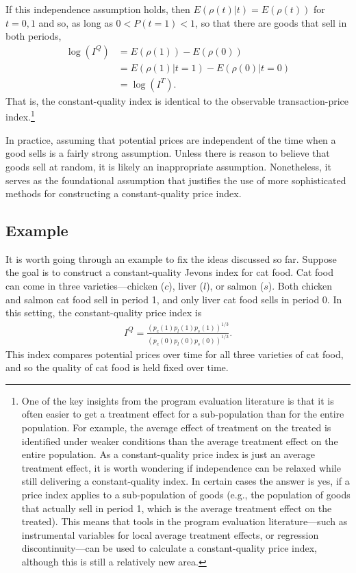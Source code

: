 \documentclass[
]{article}
\begin{document}
If this independence assumption holds, then \(E(\rho(t) | t) = E(\rho(t))\) for \(t=0,1\) and so, as long as \(0 < P(t = 1) < 1\), so that there are goods that sell in both periods,
\begin{align*}
\log(I^{Q}) &= E(\rho(1)) - E(\rho(0)) \\ 
&= E(\rho(1) | t = 1) - E(\rho(0) | t = 0) \\
&= \log(I^{T}).
\end{align*}
That is, the constant-quality index is identical to the observable transaction-price index.\footnote{One of the key insights from the program evaluation literature is that it is often easier to get a treatment effect for a sub-population than for the entire population. For example, the average effect of treatment on the treated is identified under weaker conditions than the average treatment effect on the entire population. As a constant-quality price index is just an average treatment effect, it is worth wondering if independence can be relaxed while still delivering a constant-quality index. In certain cases the answer is yes, if a price index applies to a sub-population of goods (e.g., the population of goods that actually sell in period 1, which is the average treatment effect on the treated). This means that tools in the program evaluation literature---such as instrumental variables for local average treatment effects, or regression discontinuity---can be used to calculate a constant-quality price index, although this is still a relatively new area.}

In practice, assuming that potential prices are independent of the time when a good sells is a fairly strong assumption. Unless there is reason to believe that goods sell at random, it is likely an inappropriate assumption. Nonetheless, it serves as the foundational assumption that justifies the use of more sophisticated methods for constructing a constant-quality price index.

\hypertarget{example}{%
\subsection{Example}\label{example}}

It is worth going through an example to fix the ideas discussed so far. Suppose the goal is to construct a constant-quality Jevons index for cat food. Cat food can come in three varieties---chicken (\(c\)), liver (\(l\)), or salmon (\(s\)). Both chicken and salmon cat food sell in period 1, and only liver cat food sells in period 0. In this setting, the constant-quality price index is
\begin{align*}
I^{Q} = \frac{(p_{c}(1) p_{l}(1) p_{s}(1))^{1 / 3}}{(p_{c}(0) p_{l}(0) p_{s}(0))^{1 / 3}}.
\end{align*}
This index compares potential prices over time for all three varieties of cat food, and so the quality of cat food is held fixed over time.
\end{document}
